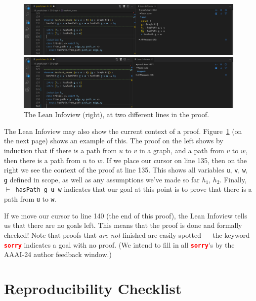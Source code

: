 \documentclass[letterpaper]{article}
\theoremstyle{definition}
\begin{document}
\begin{figure}
    \centering
    \includegraphics[scale=0.20]{lean4-example.png}
    
    \includegraphics[scale=0.20]{lean4-example2.png}
    \caption{The Lean Infoview (right), at two different lines in the proof.}
    \label{fig:example-code}
\end{figure}

The Lean Infoview may also show the current context of a proof.  Figure~\ref{fig:example-code} (on the next page) shows an example of this.  The proof on the left shows by induction that if there is a path from $u$ to $v$ in a graph, and a path from $v$ to $w$, then there is a path from $u$ to $w$.  If we place our cursor on line 135, then on the right we see the context of the proof at line 135.  This shows all variables \texttt{u}, \texttt{v}, \texttt{w}, \texttt{g} defined in scope, as well as any assumptions we've made so far \texttt{$h_1$}, \texttt{$h_2$}.  Finally, \texttt{$\vdash$ hasPath g u w} indicates that our goal at this point is to prove that there is a path from \texttt{u} to \texttt{w}.

If we move our cursor to line 140 (the end of this proof), the Lean Infoview tells us that there are no goals left.  This means that the proof is done and formally checked!  Note that proofs that \emph{are not} finished are easily spotted --- the keyword \textcolor{red}{\textbf{\texttt{sorry}}} indicates a goal with no proof.  (We intend to fill in all \textcolor{red}{\textbf{\texttt{sorry}}}'s by the AAAI-24 author feedback window.)


\section{Reproducibility Checklist}
\end{document}
